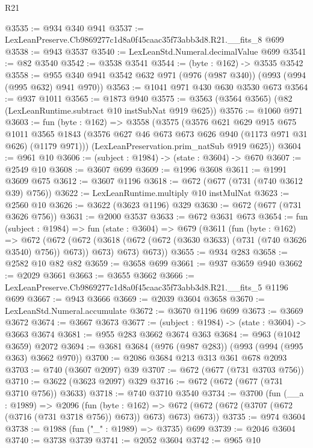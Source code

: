 \begin{lexlean}{R21}
\begin{coremodule}
@3535 := @934 @340 @941
@3537 := LexLeanPreserve.Cb9869277c1d8a0f45caac35f73abb3d8.R21.__fits_8 @699
@3538 := @943 @3537
@3540 := LexLeanStd.Numeral.decimalValue @699
@3541 := @82 @3540
@3542 := @3538 @3541
@3544 := (byte : @162) -> @3535 @3542
@3558 := @955 @340 @941 @3542 @632 @971 (@976 (@987 @340)) (@993 (@994 (@995 @632) @941 @970))
@3563 := @1041 @971 @430 @630 @3530 @673
@3564 := @937 @1011
@3565 := @1873 @940
@3575 := @3563 (@3564 @3565) (@82 (LexLeanRuntime.subtract @10 instSubNat @919 @625))
@3576 := @1060 @971
@3603 := fun (byte : @162) =>
  @3558
    (@3575
      (@3576
        @621
        @629
        @915
        @675
        @1011
        @3565
        @1843
        (@3576 @627 @46 @673 @673 @626 @940 (@1173 @971 @31 @626) (@1179 @971)))
      (LexLeanPreservation.prim_natSub @919 @625))
@3604 := @961 @10
@3606 := (subject : @1984) -> (state : @3604) -> @670
@3607 := @2549 @10
@3608 := @3607 @699
@3609 := @1996 @3608
@3611 := @1991 @3609 @675
@3612 := @3607 @1196
@3618 := @672 (@677 (@731 (@740 @3612 @39) @756))
@3622 := LexLeanRuntime.multiply @10 instMulNat
@3623 := @2560 @10
@3626 := @3622 (@3623 @1196) @329
@3630 := @672 (@677 (@731 @3626 @756))
@3631 := @2000 @3537
@3633 := @672 @3631 @673
@3654 := fun (subject : @1984) =>
  fun (state : @3604) =>
  @679
    (@3611
      (fun (byte : @162) =>
      @672
        (@672
          (@672 (@3618 (@672 (@672 (@3630 @3633) (@731 (@740 @3626 @3540) @756)) @673)) @673)
          @673)
        @673))
@3655 := @934 @283
@3658 := @2582 @10 @82 @82
@3659 := @3658 @699
@3661 := @937 @3659 @940
@3662 := @2029 @3661
@3663 := @3655 @3662
@3666 := LexLeanPreserve.Cb9869277c1d8a0f45caac35f73abb3d8.R21.__fits_5 @1196 @699
@3667 := @943 @3666
@3669 := @2039 @3604 @3658
@3670 := LexLeanStd.Numeral.accumulate
@3672 := @3670 @1196 @699
@3673 := @3669 @3672
@3674 := @3667 @3673
@3677 := (subject : @1984) -> (state : @3604) -> @3663 @3674
@3681 := @955 @283 @3662 @3674 @363
@3684 := @963 (@1042 @3659) @2072
@3694 := @3681 @3684 (@976 (@987 @283)) (@993 (@994 (@995 @363) @3662 @970))
@3700 := @2086 @3684 @213 @313 @361 @678 @2093
@3703 := @740 (@3607 @2097) @39
@3707 := @672 (@677 (@731 @3703 @756))
@3710 := @3622 (@3623 @2097) @329
@3716 := @672 (@672 (@677 (@731 @3710 @756)) @3633)
@3718 := @740 @3710 @3540
@3734 := @3700
    (fun (__a : @1989) =>
    @2096
      (fun (byte : @162) =>
      @672 (@672 (@672 (@3707 (@672 (@3716 (@731 @3718 @756)) @673)) @673) @673) @673))
@3735 := @974 @3604
@3738 := @1988 (fun ("_" : @1989) => @3735) @699
@3739 := @2046 @3604
@3740 := @3738 @3739
@3741 := @2052 @3604
@3742 := @965 @10

\end{coremodule}
\end{lexlean}
